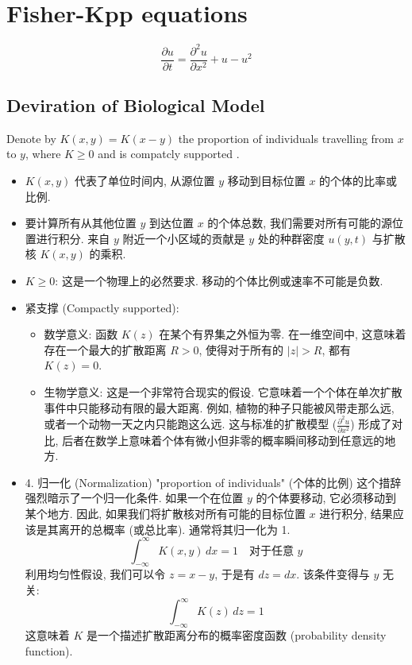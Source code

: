 \documentclass[../main.tex]{subfiles}
\begin{document}
\chapter{Fisher-Kpp equations}

\begin{definition}{}{}
\[  \frac{\partial u}{\partial t}  =  \frac{\partial ^{2}u}{\partial x^{2}}+  u-u^{2}\]
\end{definition}
    \section{Deviration of Biological Model }
    Denote by \(  K\left( x,y \right)= K\left( x-y \right)    \) the proportion of individuals travelling from \(  x  \)   to \(  y  \), where \(  K\ge 0  \) and is compatcly supported .  

    \begin{note}
        \begin{itemize}
            \item $K(x, y)$ 代表了单位时间内, 从源位置 $y$ 移动到目标位置 $x$ 的个体的比率或比例.
            \item 要计算所有从其他位置 $y$ 到达位置 $x$ 的个体总数, 我们需要对所有可能的源位置进行积分. 来自 $y$ 附近一个小区域的贡献是 $y$ 处的种群密度 $u(y, t)$ 与扩散核 $K(x, y)$ 的乘积.
            \item $K \ge 0$: 这是一个物理上的必然要求. 移动的个体比例或速率不可能是负数.
            \item 紧支撑 (Compactly supported):\begin{itemize}
                \item 数学意义: 函数 $K(z)$ 在某个有界集之外恒为零. 在一维空间中, 这意味着存在一个最大的扩散距离 $R > 0$, 使得对于所有的 $|z| > R$, 都有 $K(z) = 0$.
                \item 生物学意义: 这是一个非常符合现实的假设. 它意味着一个个体在单次扩散事件中只能移动有限的最大距离. 例如, 植物的种子只能被风带走那么远, 或者一个动物一天之内只能跑这么远. 这与标准的扩散模型 ($\frac{\partial^2 u}{\partial x^2}$) 形成了对比, 后者在数学上意味着个体有微小但非零的概率瞬间移动到任意远的地方.
                
            \end{itemize}
            \item 4. 归一化 (Normalization)
"proportion of individuals" (个体的比例) 这个措辞强烈暗示了一个归一化条件. 如果一个在位置 $y$ 的个体要移动, 它必须移动到某个地方. 因此, 如果我们将扩散核对所有可能的目标位置 $x$ 进行积分, 结果应该是其离开的总概率 (或总比率). 通常将其归一化为 1.
$$\int_{-\infty}^{\infty} K(x, y) \,dx = 1 \quad \text{对于任意 } y$$
利用均匀性假设, 我们可以令 $z = x-y$, 于是有 $dz = dx$. 该条件变得与 $y$ 无关:
$$\int_{-\infty}^{\infty} K(z) \,dz = 1$$
这意味着 $K$ 是一个描述扩散距离分布的概率密度函数 (probability density function).
        \end{itemize}
        
    \end{note}
\end{document}
